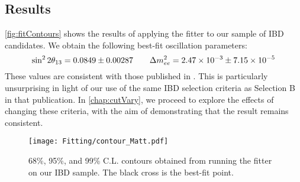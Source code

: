 \documentclass[../thesis.tex]{subfiles}
\begin{document}
\begin{comment}
Generate map of chi2 in oscillation parameter space. Take the 1sigma contour based on where the chi2 falls to XXX, etc.
\end{comment}

\subsection{Results}
\label{sec:fitResults}

\autoref{fig:fitContours} shows the results of applying the fitter to our sample of IBD candidates. We obtain the following best-fit oscillation parameters:
\begin{equation}
  \sin^2 2\theta_{13} = 0.0849 \pm 0.00287 \qquad \Delta m^2_{ee} = 2.47\times10^{-3} \pm 7.15\times10^{-5}
  \label{eq:fitResults}
\end{equation}
These values are consistent with those published in \cite{An_2017}. This is particularly unsurprising in light of our use of the same IBD selection criteria as Selection B in that publication. In \autoref{chap:cutVary}, we proceed to explore the effects of changing these criteria, with the aim of demonstrating that the result remains consistent.

\begin{figure}[ht]
  \texttt{[image: Fitting/contour\_Matt.pdf]}
  \caption{68\%, 95\%, and 99\% C.L\@. contours obtained from running the fitter on our IBD sample. The black cross is the best-fit point.}
  \label{fig:fitContours}
\end{figure}
\end{document}
